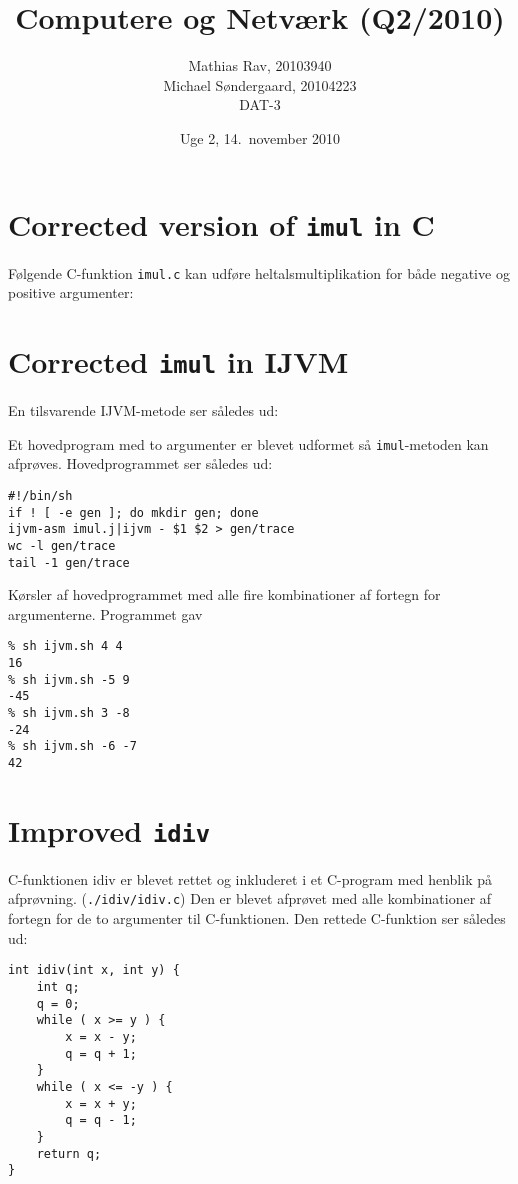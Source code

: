 \documentclass[12pt,a4paper]{article}
\title{Computere og Netværk (Q2/2010)}
\author{Mathias Rav, 20103940 \\
		Michael Søndergaard, 20104223 \\
		DAT-3}
\date{Uge 2, 14.\ november 2010}
\newcommand{\imul}{\texttt{imul}}
\begin{document}
\maketitle

\section{Corrected version of \imul{} in C}

Følgende C-funktion \texttt{imul.c} kan udføre heltalsmultiplikation for både
negative og positive argumenter:

\lstset{language=C}


\section{Corrected \imul{} in IJVM}

En tilsvarende IJVM-metode ser således ud:

\lstset{language=JVMIS}


Et hovedprogram med to argumenter er blevet udformet så \texttt{imul}-metoden
kan afprøves. Hovedprogrammet ser således ud:

\lstset{language=sh}
\begin{lstlisting}
#!/bin/sh
if ! [ -e gen ]; do mkdir gen; done
ijvm-asm imul.j|ijvm - $1 $2 > gen/trace
wc -l gen/trace
tail -1 gen/trace
\end{lstlisting}

\clearpage

Kørsler af hovedprogrammet med alle fire kombinationer af fortegn for argumenterne. Programmet gav

\lstset{language=sh}
\begin{lstlisting}
% sh ijvm.sh 4 4
16
% sh ijvm.sh -5 9
-45
% sh ijvm.sh 3 -8
-24
% sh ijvm.sh -6 -7
42
\end{lstlisting}

\section{Improved \texttt{idiv}}

C-funktionen idiv er blevet rettet og inkluderet i et C-program med henblik på afprøvning. (\texttt{./idiv/idiv.c})
Den er blevet afprøvet med alle kombinationer af fortegn for de to argumenter til C-funktionen.
Den rettede C-funktion ser således ud:

\lstset{language=C}
\begin{lstlisting}
int idiv(int x, int y) { 
	int q;
	q = 0;
	while ( x >= y ) {
		x = x - y;
		q = q + 1;
	}
	while ( x <= -y ) {
		x = x + y;
		q = q - 1;
	}
	return q;
}
\end{lstlisting}
\end{document}
